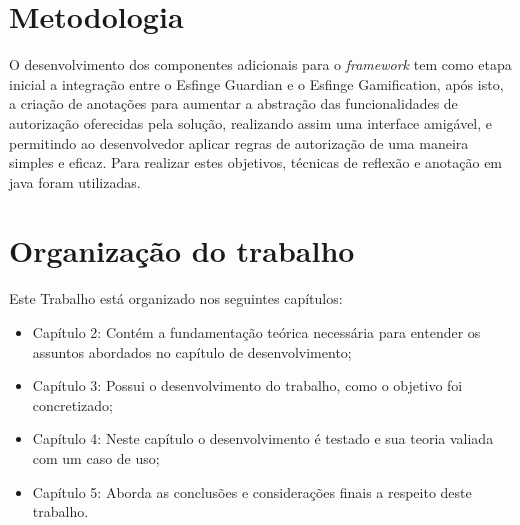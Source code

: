 \section{Metodologia}

\par O desenvolvimento dos componentes adicionais para o \textit{framework} tem como etapa inicial a integração entre o Esfinge Guardian e o Esfinge Gamification, após isto, a criação de anotações para aumentar a abstração das funcionalidades de autorização oferecidas pela solução, realizando assim uma interface amigável, e permitindo ao desenvolvedor aplicar regras de autorização de uma maneira simples e eficaz. Para realizar estes objetivos, técnicas de reflexão e anotação em java foram utilizadas.

\section{Organização do trabalho}

Este Trabalho está organizado nos seguintes capítulos:

\begin{itemize}
	\item Capítulo 2: Contém a fundamentação teórica necessária para entender os assuntos abordados no capítulo de desenvolvimento;
	\item Capítulo 3: Possui o desenvolvimento do trabalho, como o objetivo foi concretizado;
	\item Capítulo 4: Neste capítulo o desenvolvimento é testado e sua teoria valiada com um caso de uso;
	\item Capítulo 5: Aborda as conclusões e considerações finais a respeito deste trabalho.
\end{itemize}